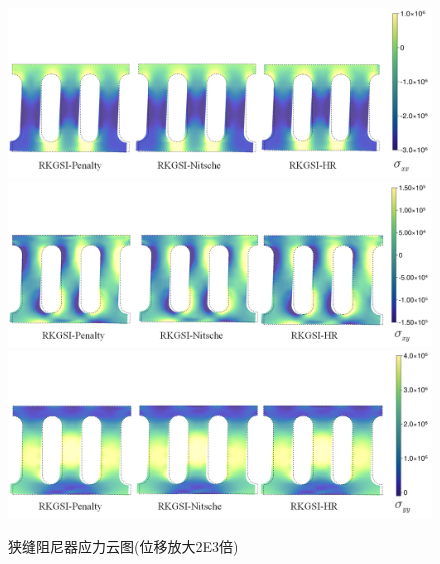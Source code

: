 \begin{figure}[H]
    \centering
        \includegraphics[scale=0.5]{figure/DAMPER/slit/M11.png}
        \includegraphics[scale=0.5]{figure/DAMPER/slit/M12.png}
        \includegraphics[scale=0.5]{figure/DAMPER/slit/M22.png}
    \caption{狭缝阻尼器应力云图(位移放大2E3倍)}\label{slitM}
\end{figure}
